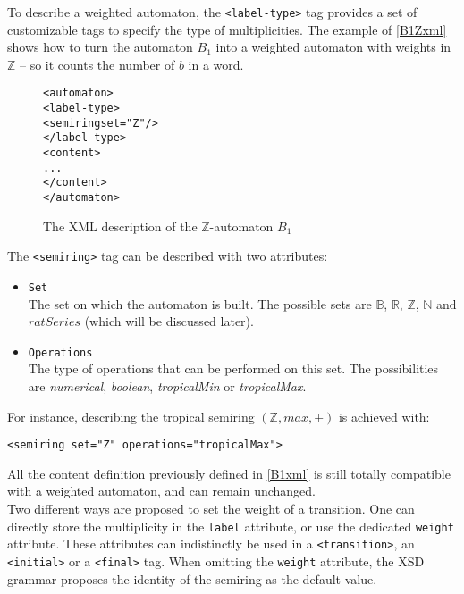\documentclass[a4paper]{article}
\def\typetagend{\texttt{</label-type>}}
\def\typetag{\texttt{<label-type>}}
\def\transitiontag{\texttt{<transition>}}
\def\finaltag{\texttt{<final>}}
\def\initialtag{\texttt{<initial>}}
\def\semiringtag{\texttt{<semiring>}}
\begin{document}
To describe a weighted automaton, the \typetag{} tag provides a set
of customizable tags to specify the type of multiplicities. The example
of \autoref{B1Zxml} shows how to turn the automaton $B_1$ into a
weighted automaton with weights in ${\mathbb Z}$ -- so it counts the
number of $b$ in a word.

{\small

\begin{figure}[h]
  \begin{center}
\begin{alltt}
<automaton>
  \typetag{}
     <semiring set="Z"/>
  \typetagend{}
  <content>
  ...
  </content>
</automaton>
\end{alltt}

\caption{The XML description of the $\mathbb{Z}$-automaton $B_1$}
\label{B1Zxml}
  \end{center}
\end{figure}

}

The \semiringtag{} tag can be described with two attributes:
\begin{itemize}
  \item \texttt{Set}\\
    The set on which the automaton is built. The possible sets are
    ${\mathbb B}$, ${\mathbb R}$, ${\mathbb Z}$, ${\mathbb N}$ and $ratSeries$
    (which will be discussed later).
  \item \texttt{Operations}\\
    The type of operations that can be performed on this set.
    The possibilities are \textit{numerical}, \textit{boolean}, \textit{tropicalMin}
    or \textit{tropicalMax}.
\end{itemize}

For instance, describing the tropical semiring $({\mathbb Z}, max, +)$
is achieved with:
\begin{center}
{\small
\verb|<semiring set="Z" operations="tropicalMax">|}
\end{center}

All the content definition previously defined in \autoref{B1xml} is
still totally compatible with a weighted automaton, and can remain
unchanged.\\

Two different ways are proposed to set the weight of a transition. One
can directly store the multiplicity in the \verb|label| attribute, or
use the dedicated \verb|weight| attribute. These attributes can
indistinctly be used in a \transitiontag{}, an \initialtag{} or a
\finaltag{} tag. When omitting the \verb|weight| attribute, the XSD
grammar proposes the identity of the semiring as the default
value.\\\\
\end{document}
